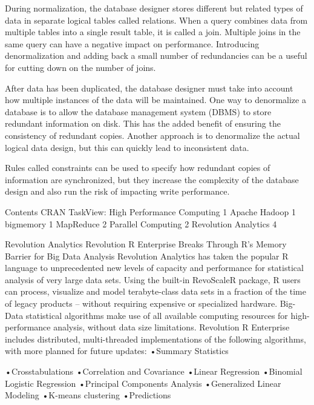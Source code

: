 During normalization, the database designer stores different but related types of data in separate logical tables called relations. When a query combines data from multiple tables into a single result table, it is called a join. Multiple joins in the same query can have a negative impact on performance. Introducing denormalization and adding back a small number of redundancies can be a useful for cutting down on the number of joins.

After data has been duplicated, the database designer must take into account how multiple instances of the data will be maintained. One way to denormalize a database is to allow the database management system (DBMS) to store redundant information on disk. This has the added benefit of ensuring the consistency of redundant copies. Another approach is to denormalize the actual logical data design, but this can quickly lead to inconsistent data. 

Rules called constraints can be used to specify how redundant copies of information are synchronized, but they increase the complexity of the database design and also run the risk of impacting write performance.




%
 

Contents
CRAN TaskView:  High Performance Computing	1
Apache Hadoop	1
bigmemory	1
MapReduce	2
Parallel Computing	2
Revolution Analytics	4



Revolution Analytics
Revolution R Enterprise Breaks Through R’s Memory Barrier for Big Data Analysis
Revolution Analytics has taken the popular R language to unprecedented new levels of capacity and performance for statistical analysis of very large data sets. Using the built-in RevoScaleR package, R users can process, visualize and model terabyte-class data sets in a fraction of the time of legacy products – without requiring expensive or specialized hardware.
Big-Data statistical algorithms make use of all available computing resources for high-performance analysis, without data size limitations. Revolution R Enterprise includes distributed, multi-threaded implementations of the following algorithms, with more planned for future updates: •Summary Statistics
 
•Crosstabulations
•Correlation and Covariance
•Linear Regression
•Binomial Logistic Regression
•Principal Components Analysis
•Generalized Linear Modeling
•K-means clustering 
•Predictions
